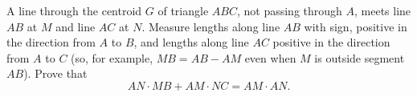 A line through the centroid $G$ of triangle $ABC$, not passing through $A$, meets line $AB$ at $M$ and line $AC$ at $N$. Measure lengths along line $AB$ with sign, positive in the direction from $A$ to $B$, and lengths along line $AC$ positive in the direction from $A$ to $C$ (so, for example, $MB=AB-AM$ even when $M$ is outside segment $AB$). Prove that
\[AN\cdot MB+AM\cdot NC=AM\cdot AN.\]
